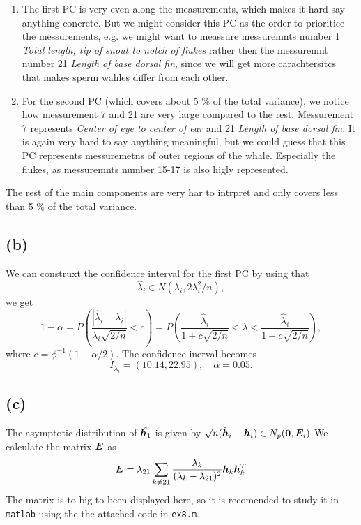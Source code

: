 \begin{enumerate}
\item The first PC is very even along the measurements, which makes it
  hard say anything concrete. But we might consider this PC as the
  order to prioritice the messurements, e.g. we might want to meassure
  messuremnts number 1 \textit{Total length, tip of snout to notch of
    flukes} rather then the messuremnt number 21 \textit{Length of base
    dorsal fin}, since we will get more carachtersitcs that makes sperm
  wahles differ from each other.
\item For the second PC (which  covers about 5 \% of the total variance), we notice how messurement 7 and 21 are very
  large compared to the rest. Messurement 7 represents \textit{Center of
    eye to center of ear} and 21 \textit{Length of base  dorsal fin}. It
  is again very hard to say anything meaningful, but we could guess that
  this PC represents messuremetns of outer regions of the
  whale. Especially the flukes, as messuremnts number 15-17 is also
  higly represented.
\end{enumerate}
The rest of the main components are very har to intrpret and only
covers less than 5 \% of the total variance.

\subsection*{(b)}
\label{sec:b-7}
 We can construxt the confidence interval for the first PC by using
 that
 \begin{equation*}
   \hat\lambda_i \in N(\lambda_i, 2\lambda^2_i/n),
 \end{equation*}
we get
\begin{equation*}
 1- \alpha =  P\left(\frac{|\hat\lambda_i - \lambda_i|}{\lambda_i\sqrt{2/n}} < c\right) =
 P\left(\frac{\hat\lambda_i}{1 + c\sqrt{2/n}} < \lambda < \frac{\hat\lambda_i}{1 - c\sqrt{2/n}}\right),
\end{equation*}
where $c = \phi^{-1}(1 - \alpha/2)$. The confidence inerval becomes
\begin{equation*}
  I_{\lambda_{i}} = (10.14, 22.95), \quad \alpha = 0.05.
\end{equation*}

\subsection*{(c)}
\label{sec:c-7}
The asymptotic distribution of $ \hat{\bm{h}_1}$ is given by $\sqrt n
(\hat{\bm{h}}_i - \bm{h}_i) \in N_p(\bm{0}, \bm{E}_i)$
We calculate the matrix $\bm{E}$ as
\begin{equation*}
  \bm{E} = \lambda_{21} \sum_{k \neq 21}\frac{\lambda_k}{(\lambda_k -
    \lambda_{21})^2 }\bm{h}_k \bm{h}_k^T
\end{equation*}
The matrix is to big to been displayed here, so it is recomended to
study it in \texttt{matlab} using the the attached code in
\texttt{ex8.m}.

